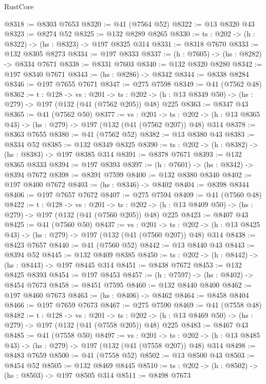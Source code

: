 \begin{lexlean}{RustCore}
\begin{coremodule}
@8318 := @8303 @7653
@8320 := @41 (@7564 @52)
@8322 := @13 @8320 @43
@8323 := @8274 @52
@8325 := @132 @8289 @8265
@8330 := {ts : @202} -> (h : @8322) -> (hs : @8323) -> @197 @8325 @314
@8331 := @8318 @7670
@8333 := @132 @8305 @8273
@8334 := @197 @8333
@8337 := (h : @7605) -> (hs : @8282) -> @8334 @7671
@8338 := @8331 @7603
@8340 := @132 @8320 @8280
@8342 := @197 @8340 @7671
@8343 := (hs : @8286) -> @8342
@8344 := @8338 @8284
@8346 := @197 @7655 @7671
@8347 := @275 @7598
@8349 := @41 (@7562 @48)
@8362 := {t : @128} ->
  {vs : @201} ->
  {ts : @202} -> (h : @13 @8349 @50) -> (hs : @279) -> @197 (@132 (@41 (@7562 @205)) @48) @225
@8363 := @8347 @43
@8365 := @41 (@7562 @50)
@8377 := {vs : @201} ->
  {ts : @202} -> (h : @13 @8365 @43) -> (hs : @279) -> @197 (@132 (@41 (@7562 @207)) @48) @314
@8378 := @8363 @7655
@8380 := @41 (@7562 @52)
@8382 := @13 @8380 @43
@8383 := @8334 @52
@8385 := @132 @8349 @8325
@8390 := {ts : @202} -> (h : @8382) -> (hs : @8383) -> @197 @8385 @314
@8391 := @8378 @7671
@8393 := @132 @8365 @8333
@8394 := @197 @8393
@8397 := (h : @7601) -> (hs : @8342) -> @8394 @7672
@8398 := @8391 @7599
@8400 := @132 @8380 @8340
@8402 := @197 @8400 @7672
@8403 := (hs : @8346) -> @8402
@8404 := @8398 @8344
@8406 := @197 @7657 @7672
@8407 := @275 @7594
@8409 := @41 (@7560 @48)
@8422 := {t : @128} ->
  {vs : @201} ->
  {ts : @202} -> (h : @13 @8409 @50) -> (hs : @279) -> @197 (@132 (@41 (@7560 @205)) @48) @225
@8423 := @8407 @43
@8425 := @41 (@7560 @50)
@8437 := {vs : @201} ->
  {ts : @202} -> (h : @13 @8425 @43) -> (hs : @279) -> @197 (@132 (@41 (@7560 @207)) @48) @314
@8438 := @8423 @7657
@8440 := @41 (@7560 @52)
@8442 := @13 @8440 @43
@8443 := @8394 @52
@8445 := @132 @8409 @8385
@8450 := {ts : @202} -> (h : @8442) -> (hs : @8443) -> @197 @8445 @314
@8451 := @8438 @7672
@8453 := @132 @8425 @8393
@8454 := @197 @8453
@8457 := (h : @7597) -> (hs : @8402) -> @8454 @7673
@8458 := @8451 @7595
@8460 := @132 @8440 @8400
@8462 := @197 @8460 @7673
@8463 := (hs : @8406) -> @8462
@8464 := @8458 @8404
@8466 := @197 @7659 @7673
@8467 := @275 @7590
@8469 := @41 (@7558 @48)
@8482 := {t : @128} ->
  {vs : @201} ->
  {ts : @202} -> (h : @13 @8469 @50) -> (hs : @279) -> @197 (@132 (@41 (@7558 @205)) @48) @225
@8483 := @8467 @43
@8485 := @41 (@7558 @50)
@8497 := {vs : @201} ->
  {ts : @202} -> (h : @13 @8485 @43) -> (hs : @279) -> @197 (@132 (@41 (@7558 @207)) @48) @314
@8498 := @8483 @7659
@8500 := @41 (@7558 @52)
@8502 := @13 @8500 @43
@8503 := @8454 @52
@8505 := @132 @8469 @8445
@8510 := {ts : @202} -> (h : @8502) -> (hs : @8503) -> @197 @8505 @314
@8511 := @8498 @7673

\end{coremodule}
\end{lexlean}
